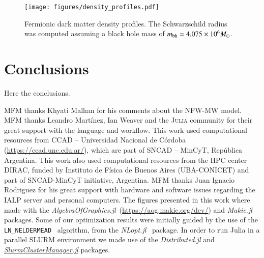 \documentclass[twocolumn]{aa}
\begin{document}
\begin{figure*}
   \centering
   \texttt{[image: figures/density\_profiles.pdf]}
   \caption{Fermionic dark matter density profiles. The Schwarzschild radius was computed assuming a black hole mass of $m_{\rm{bh}}=4.075\times10^6 M_\odot$.}

   \label{fig:going_compact}
\end{figure*}


\section{Conclusions}
\label{sec:conclusions}
Here the conclusions.


\begin{acknowledgements}
    MFM thanks Khyati Malhan for his comments about the NFW-MW model.
    MFM thanks Leandro Martínez, Ian Weaver and the \textsc{Julia} community for their
    great support with the language and workflow.
    This work used computational resources from CCAD – Universidad
    Nacional de Córdoba (\href{https://ccad.unc.edu.ar/}{https://ccad.unc.edu.ar/}),
    which are part of SNCAD – MinCyT, República Argentina.
    This work also used computational resources from the HPC center DIRAC,
    funded by Instituto de Física de Buenos Aires (UBA-CONICET) and part of SNCAD-MinCyT initiative, Argentina.
    MFM thanks Juan Ignacio Rodriguez for his great support with hardware and
    software issues regarding the IALP server and personal computers.
    The figures presented in this work where made with the
    {\it AlgebraOfGraphics.jl}~(\href{https://aog.makie.org/dev/}{https://aog.makie.org/dev/}) and
    {\it Makie.jl}~\citep{DanischKrumbiegel2021}
    packages. Some of our optimization results were initially guided by the use of the \texttt{LN\_NELDERMEAD}~\citep{NELDERMEAD,10.1093/comjnl/8.1.42,shere} algorithm, from the {\it NLopt.jl}~\citep{NLopt} package.
    In order to run {\sc Julia} in a parallel SLURM environment we made use of the {\it Distributed.jl} and \href{https://github.com/kleinhenz/SlurmClusterManager.jl}{\it SlurmClusterManager.jl} packages.
\end{acknowledgements}

%
%
%
\end{document}
